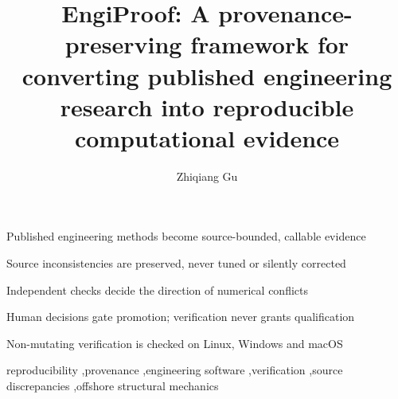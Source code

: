\documentclass[preprint,12pt]{elsarticle}
\begin{document}
\begin{frontmatter}

\title{EngiProof: A provenance-preserving framework for converting published engineering research into reproducible computational evidence}

\author{Zhiqiang Gu}



\begin{highlights}
\item Published engineering methods become source-bounded, callable evidence
\item Source inconsistencies are preserved, never tuned or silently corrected
\item Independent checks decide the direction of numerical conflicts
\item Human decisions gate promotion; verification never grants qualification
\item Non-mutating verification is checked on Linux, Windows and macOS
\end{highlights}

\begin{keyword}
reproducibility \sep provenance \sep engineering software \sep verification \sep source discrepancies \sep offshore structural mechanics
\end{keyword}

\end{frontmatter}

















\appendix





\end{document}
